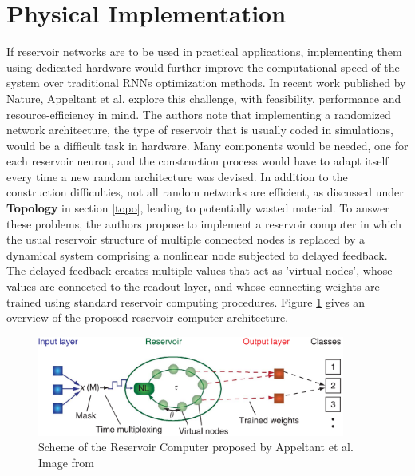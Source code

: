 \documentclass[12pt,oneside]{CUNY_CS_PhD}
\begin{document}
\section{Physical Implementation}
If reservoir networks are to be used in practical applications, implementing them using dedicated hardware would further improve the computational speed of the system over traditional RNNs optimization methods. In recent work published by Nature, Appeltant et al. \cite{appeltant2011information, appeltant2014constructing} 
explore this challenge, with feasibility, performance and resource-efficiency in mind. The authors note that implementing a randomized network architecture, the type of reservoir that is usually coded in simulations, would be a difficult task in hardware. Many components would be needed, one for each reservoir neuron, and the construction process would have to adapt itself every time a new random architecture was devised. In addition to the construction difficulties, not all random networks are efficient, as discussed under \textbf{Topology} in section \ref{topo}, leading to potentially wasted material. To answer these problems, the authors propose to implement a reservoir computer in which the usual reservoir structure of multiple connected nodes is replaced by a dynamical system comprising a nonlinear node subjected to delayed feedback. The delayed feedback creates multiple values that act as 'virtual nodes', whose values are connected to the readout layer, and whose connecting weights are trained using standard reservoir computing procedures. Figure \ref{fig:delayed_fb} gives an overview of the proposed reservoir computer architecture.
\begin{figure}[!htbp]
\centering
\includegraphics[width=0.9\textwidth]{pictures/delayed-feedback-res.png}
\caption{Scheme of the Reservoir Computer proposed by Appeltant et al. Image from \cite{appeltant2011information}}
\label{fig:delayed_fb}
\end{figure}\\
\end{document}
